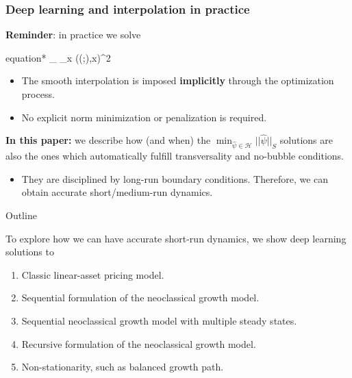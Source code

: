 \documentclass[aspectratio=169,10pt]{beamer}
\newcommand{\emphcolor}[1]{\textbf{\textcolor{emphcolorval}{#1}}}
\newcommand{\Xtrain}{\hat{\mathcal{X}}}
\begin{document}
\begin{frame}
	\frametitle{Deep learning and interpolation in practice}
	\emphcolor{Reminder}: in practice we solve
	\begin{empheq}[box=\tcbhighmath]{equation*}
		\min_{\theta \in \Theta} \sum_{x \in \Xtrain} \ell\left(\hat{\psi}(\cdot;\theta),x\right)^2
	\end{empheq}
	\begin{itemize}
		\item The smooth interpolation is imposed \emphcolor{implicitly} through the optimization process.
		\item No explicit norm minimization or penalization is required.
	\end{itemize}
	\emphcolor{In this paper:} we describe how (and when) the $\min_{\hat{\psi}\in \mathcal{H}} ||\hat{\psi}||_S$ solutions are also the ones which  automatically fulfill transversality and no-bubble conditions.  
	\begin{itemize}
		\item They are disciplined by long-run boundary conditions. Therefore, we can obtain accurate short/medium-run dynamics. 
	\end{itemize}
\end{frame}

\begin{frame}{Outline}
	
	To explore how we can have accurate short-run dynamics, we show deep learning solutions to
	\begin{enumerate}
		\item Classic linear-asset pricing model.\vspace{0.1in}
		\item Sequential formulation of the neoclassical growth model.\vspace{0.1in}
		\item Sequential neoclassical growth model with multiple steady states.\vspace{0.1in}
		\item Recursive formulation of the neoclassical growth model.\vspace{0.1in}
		\item  Non-stationarity, such as balanced growth path.\vspace{0.1in}
		
	\end{enumerate}
	
\end{frame}
\end{document}
